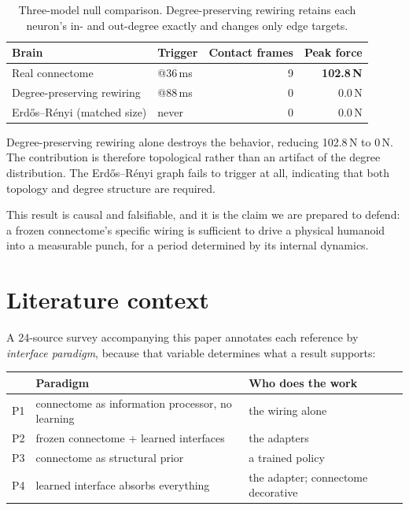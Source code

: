 \documentclass[11pt]{article}
\begin{document}
\begin{table}[h]
\centering
\begin{tabular}{@{}llrr@{}}
\toprule
Brain & Trigger & Contact frames & Peak force \\
\midrule
Real connectome                    & @36\,ms & 9 & \textbf{102.8\,N} \\
Degree-preserving rewiring         & @88\,ms & 0 & 0.0\,N \\
Erd\H{o}s--R\'enyi (matched size)  & never   & 0 & 0.0\,N \\
\bottomrule
\end{tabular}
\caption{Three-model null comparison. Degree-preserving rewiring retains each
neuron's in- and out-degree exactly and changes only edge targets.}
\label{tab:null}
\end{table}

Degree-preserving rewiring alone destroys the behavior, reducing 102.8\,N to
0\,N. The contribution is therefore topological rather than an artifact of the
degree distribution. The Erd\H{o}s--R\'enyi graph fails to trigger at all,
indicating that both topology and degree structure are required.

This result is causal and falsifiable, and it is the claim we are prepared to
defend: a frozen connectome's specific wiring is sufficient to drive a physical
humanoid into a measurable punch, for a period determined by its internal
dynamics.

\section{Literature context}

A 24-source survey accompanying this paper annotates each reference by
\emph{interface paradigm}, because that variable determines what a result
supports:

\begin{center}
\begin{tabular}{@{}llp{6.3cm}@{}}
\toprule
& Paradigm & Who does the work \\
\midrule
P1 & connectome as information processor, no learning & the wiring alone \\
P2 & frozen connectome + learned interfaces           & the adapters \\
P3 & connectome as structural prior                   & a trained policy \\
P4 & learned interface absorbs everything             & the adapter; connectome decorative \\
\bottomrule
\end{tabular}
\end{center}
\end{document}
